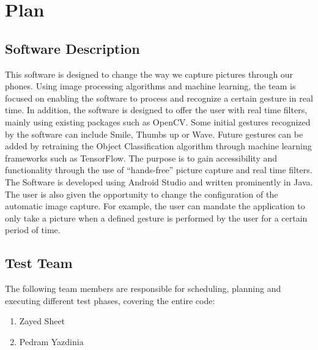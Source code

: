 \documentclass[12pt, titlepage]{article}
\begin{document}
\section{Plan}
	
\subsection{Software Description}
This software is designed to change the way we capture pictures through our phones. Using image processing algorithms and machine learning, the team is focused on enabling the software to process and recognize a certain gesture in real time. In addition, the software is designed to offer the user with real time filters, mainly using existing packages such as OpenCV. Some initial gestures recognized by the software can include Smile, Thumbs up or Wave. Future gestures can be added by retraining the Object Classification algorithm through machine learning frameworks such as TensorFlow. The purpose is to gain accessibility and functionality through the use of “hands-free” picture capture and real time filters. The Software is developed using Android Studio and written prominently in Java. The user is also given the opportunity to change the configuration of the automatic image capture. For example, the user can mandate the application to only take a picture when a defined gesture is performed by the user for a certain period of time. 

\subsection{Test Team}
The following team members are responsible for scheduling, planning and executing different test phases, covering the entire code:
\begin{enumerate}
    \item Zayed Sheet
    \item Pedram Yazdinia
\end{enumerate}
\end{document}
